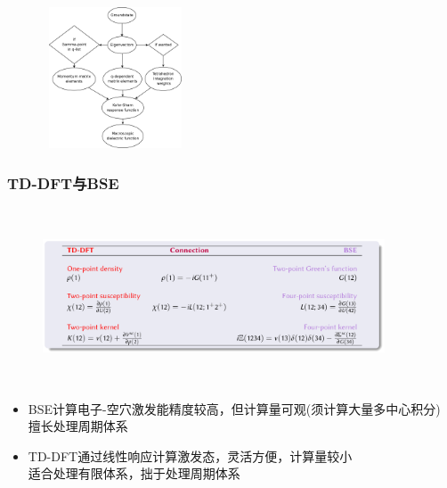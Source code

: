 {{{\begin{itemize}
\begin{displaymath}
		\end{displaymath}
\end{itemize} }}
\begin{figure}[h!]
\centering
\vspace{-10pt}
\includegraphics[height=1.65in,width=1.70in,viewport=0 0 1200 1300,clip]{Figures/lr-TDDFT_flowchart.png}
\label{lr-DFT-flowchart}
\end{figure}
}

\frame
{
	\frametitle{\textrm{TD-DFT}与\textrm{BSE}}
\begin{figure}[h!]
\centering
\vspace{-50pt}
\includegraphics[height=2.05in,width=4.00in,viewport=50 0 1450 730,clip]{Figures/DFT_GW_BSE-compare.png}
\label{DFTGW-BSE_compare}
\end{figure}
\begin{itemize}
	\item \textrm{BSE}计算电子-空穴激发能精度较高，但计算量可观(须计算大量多中心积分)\\
		擅长处理周期体系
	\item \textrm{TD-DFT}通过线性响应计算激发态，灵活方便，计算量较小\\
		适合处理有限体系，拙于处理周期体系
\end{itemize}
}

